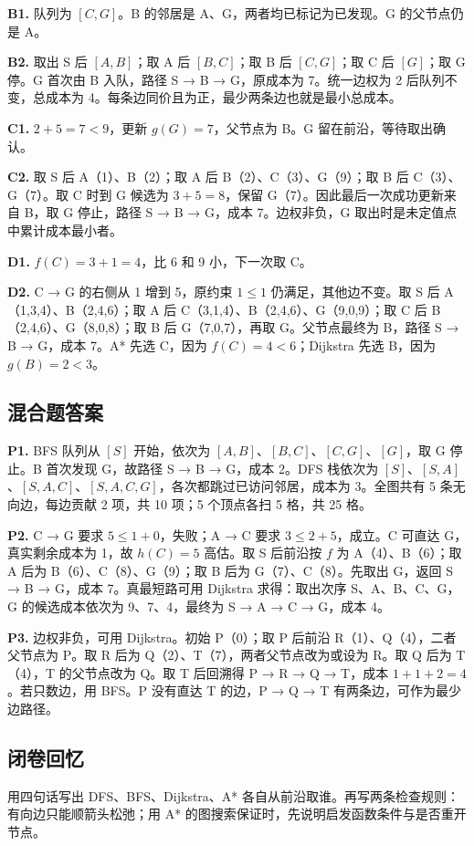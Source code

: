 \documentclass[UTF8,a4paper,11pt]{ctexart}
\begin{document}
\textbf{B1.} 队列为 $[C,G]$。B 的邻居是 A、G，两者均已标记为已发现。G 的父节点仍是 A。

\textbf{B2.} 取出 S 后 $[A,B]$；取 A 后 $[B,C]$；取 B 后 $[C,G]$；取 C 后 $[G]$；取 G 停。G 首次由 B 入队，路径 S → B → G，原成本为 7。统一边权为 2 后队列不变，总成本为 4。每条边同价且为正，最少两条边也就是最小总成本。

\textbf{C1.} $2+5=7<9$，更新 $g(G)=7$，父节点为 B。G 留在前沿，等待取出确认。

\textbf{C2.} 取 S 后 A（1）、B（2）；取 A 后 B（2）、C（3）、G（9）；取 B 后 C（3）、G（7）。取 C 时到 G 候选为 $3+5=8$，保留 G（7）。因此最后一次成功更新来自 B，取 G 停止，路径 S → B → G，成本 7。边权非负，G 取出时是未定值点中累计成本最小者。

\textbf{D1.} $f(C)=3+1=4$，比 6 和 9 小，下一次取 C。

\textbf{D2.} C → G 的右侧从 1 增到 5，原约束 $1\le1$ 仍满足，其他边不变。取 S 后 A（1,3,4）、B（2,4,6）；取 A 后 C（3,1,4）、B（2,4,6）、G（9,0,9）；取 C 后 B（2,4,6）、G（8,0,8）；取 B 后 G（7,0,7），再取 G。父节点最终为 B，路径 S → B → G，成本 7。A* 先选 C，因为 $f(C)=4<6$；Dijkstra 先选 B，因为 $g(B)=2<3$。

\clearpage
\subsection{混合题答案}
\textbf{P1.} BFS 队列从 $[S]$ 开始，依次为 $[A,B]$、$[B,C]$、$[C,G]$、$[G]$，取 G 停止。B 首次发现 G，故路径 S → B → G，成本 2。DFS 栈依次为 $[S]$、$[S,A]$、$[S,A,C]$、$[S,A,C,G]$，各次都跳过已访问邻居，成本为 3。全图共有 5 条无向边，每边贡献 2 项，共 10 项；5 个顶点各扫 5 格，共 25 格。

\textbf{P2.} C → G 要求 $5\le1+0$，失败；A → C 要求 $3\le2+5$，成立。C 可直达 G，真实剩余成本为 1，故 $h(C)=5$ 高估。取 S 后前沿按 $f$ 为 A（4）、B（6）；取 A 后为 B（6）、C（8）、G（9）；取 B 后为 G（7）、C（8）。先取出 G，返回 S → B → G，成本 7。真最短路可用 Dijkstra 求得：取出次序 S、A、B、C、G，G 的候选成本依次为 9、7、4，最终为 S → A → C → G，成本 4。

\textbf{P3.} 边权非负，可用 Dijkstra。初始 P（0）；取 P 后前沿 R（1）、Q（4），二者父节点为 P。取 R 后为 Q（2）、T（7），两者父节点改为或设为 R。取 Q 后为 T（4），T 的父节点改为 Q。取 T 后回溯得 P → R → Q → T，成本 $1+1+2=4$。若只数边，用 BFS。P 没有直达 T 的边，P → Q → T 有两条边，可作为最少边路径。

\subsection{闭卷回忆}
用四句话写出 DFS、BFS、Dijkstra、A* 各自从前沿取谁。再写两条检查规则：有向边只能顺箭头松弛；用 A* 的图搜索保证时，先说明启发函数条件与是否重开节点。
\end{document}
